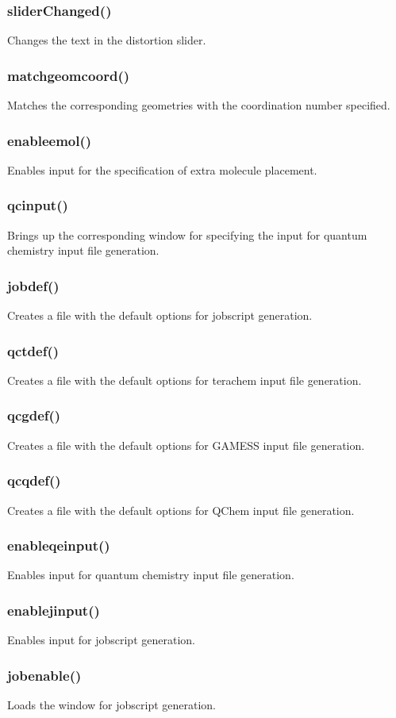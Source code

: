 \documentclass[a4paper,12pt]{assignment}
\begin{document}
\subsubsection{sliderChanged()}
Changes the text in the distortion slider.
\subsubsection{matchgeomcoord()}
Matches the corresponding geometries with the coordination number specified.
\subsubsection{enableemol()}
Enables input for the specification of extra molecule placement.
\subsubsection{qcinput()}
Brings up the corresponding window for specifying the input for quantum chemistry input file generation.
\subsubsection{jobdef()}
Creates a file with the default options for jobscript generation.
\subsubsection{qctdef()}
Creates a file with the default options for terachem input file generation.
\subsubsection{qcgdef()}
Creates a file with the default options for GAMESS input file generation.
\subsubsection{qcqdef()}
Creates a file with the default options for QChem input file generation.
\subsubsection{enableqeinput()}
Enables input for quantum chemistry input file generation.
\subsubsection{enablejinput()}
Enables input for jobscript generation.
\subsubsection{jobenable()}
Loads the window for jobscript generation.
\end{document}
